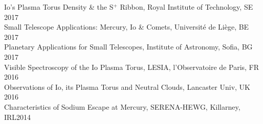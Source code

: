 \documentclass[12pt]{report}
\begin{document}
\noindent Io's Plasma Torus Density \& the S$^+$ Ribbon, Royal Institute of Technology, SE \hfill 2017\\
\noindent Small Telescope Applications: Mercury, Io \& Comets, Universit\'e de Li\`ege, BE \hfill 2017\\
\noindent Planetary Applications for Small Telescopes, Institute of Astronomy, Sofia, BG \hfill 2017\\
\noindent Visible Spectroscopy of the Io Plasma Torus, LESIA, l'Observatoire de Paris, FR \hfill 2016\\
\noindent Observations of Io, its Plasma Torus and Neutral Clouds, Lancaster Univ, UK \hfill 2016\\
\noindent Characteristics of Sodium Escape at Mercury, SERENA-HEWG, Killarney, IRL\hfill 2014\\

\end{document}
